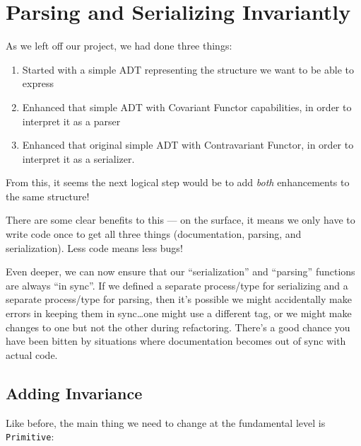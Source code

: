 \documentclass[]{article}
\begin{document}
\section{Parsing and Serializing
Invariantly}\label{parsing-and-serializing-invariantly}

As we left off our project, we had done three things:

\begin{enumerate}
\def\labelenumi{\arabic{enumi}.}
\tightlist
\item
  Started with a simple ADT representing the structure we want to be able to
  express
\item
  Enhanced that simple ADT with Covariant Functor capabilities, in order to
  interpret it as a parser
\item
  Enhanced that original simple ADT with Contravariant Functor, in order to
  interpret it as a serializer.
\end{enumerate}

From this, it seems the next logical step would be to add \emph{both}
enhancements to the same structure!

There are some clear benefits to this --- on the surface, it means we only have
to write code once to get all three things (documentation, parsing, and
serialization). Less code means less bugs!

Even deeper, we can now ensure that our ``serialization'' and ``parsing''
functions are always ``in sync''. If we defined a separate process/type for
serializing and a separate process/type for parsing, then it's possible we might
accidentally make errors in keeping them in sync\ldots one might use a different
tag, or we might make changes to one but not the other during refactoring.
There's a good chance you have been bitten by situations where documentation
becomes out of sync with actual code.

\subsection{Adding Invariance}\label{adding-invariance}

Like before, the main thing we need to change at the fundamental level is
\texttt{Primitive}:
\end{document}
